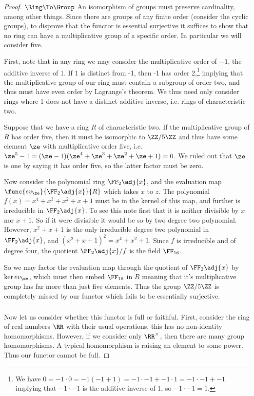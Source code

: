 \documentclass[main.tex]{subfiles}
\begin{document}
\begin{proof} {\(\Ring\To\Group\)}
	An isomorphism of groups must preserve cardinality, among other things.
	Since there are groups of any finite order (consider the cyclic groups), to
	disprove that the functor is essential surjective it suffices to show that
	no ring can have a multiplicative group of a specific order. In particular
	we will consider five.

	First, note that in any ring we may consider the multiplicative order of
	\(-1\), the additive inverse of 1. If 1 is distinct from -1, then -1 has
	order 2,\footnote{We have
		\(0=-1\cdot 0=-1(-1+1)=-1\cdot-1+-1\cdot1=-1\cdot-1+-1\) implying that
	\(-1\cdot-1\) is the additive inverse of 1, so \(-1\cdot-1=1\).} implying
	that the multiplicative group of our ring must contain a subgroup of order
	two, and thus must have even order by Lagrange's theorem. We thus need only
	consider rings where 1 does not have a distinct additive inverse, i.e.
	rings of characteristic two.

	Suppose that we have a ring \(R\) of characteristic two. If the
	multiplicative group of \(R\) has order five, then it must be isomorphic to
	\(\ZZ/5\ZZ\) and thus have some element \(\ze\) with multiplicative order
	five, i.e. \(\ze^5-1=(\ze-1)(\ze^4+\ze^3+\ze^2+\ze+1)=0\). We ruled out that
	\(\ze\) is one by saying it has order five, so the latter factor must be
	zero. %

	Now consider the polynomial ring \(\FF_2\adj{x}\), and the evaluation map
	\(\func{ev_\ze}{\FF_2\adj{x}}{R}\) which takes \(x\) to \(z\). The
	polynomial \(f(x)=x^4+x^3+x^2+x+1\) must be in the kernel of this map, and
	further is irreducible in \(\FF_2\adj{x}\). To see this note first that it
	is neither divisible by \(x\) nor \(x+1\). So if it were divisible it would
	be so by two degree two polynomial. However, \(x^2+x+1\) is the only
	irreducible degree two polynomial in \(\FF_2\adj{x}\), and
	\((x^2+x+1)^2=x^4+x^2+1\). Since \(f\) is irreducible and of degree four,
	the quotient \(\FF_2\adj{x}/f\) is the field \(\FF_{16}\).
	
	So we may factor the evaluation map through the quotient of \(\FF_2\adj{x}\)
	by \(\ker ev_\ze\), which must then embed \(\FF_{16}\) in \(R\) meaning that
	it's multiplicative group has far more than just five elements. Thus the
	group \(\ZZ/5\ZZ\) is completely missed by our functor which fails to be
	essentially surjective.

	\subparagraph{}
	Now let us consider whether this functor is full or faithful. First,
	consider the ring of real numbers \(\RR\) with their usual operations, this
	has no non-identity homomorphisms. However, if we consider only
	\(\RR^\times\), then there are many group homomorphisms. A typical
	homomorphism is raising an element to some power. Thus our functor cannot be
	full.


\end{proof}
\end{document}
